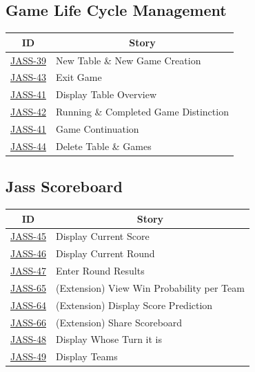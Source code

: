 \subsection {Game Life Cycle Management}

\begin{tabular} { | m{1.75 cm} | m{5.25cm} | }
    \hline
    \multicolumn{1}{|c|}{\textbf{ID}} & \multicolumn{1}{|c|}{ \textbf{Story} }  \\
    \hline
    \href{https://jasstracker-jira.atlassian.net/browse/JASS-39}{JASS-39}  & New Table \& New Game Creation \\
    \hline
    \href{https://jasstracker-jira.atlassian.net/browse/JASS-43}{JASS-43} & Exit Game \\
    \hline
    \href{https://jasstracker-jira.atlassian.net/browse/JASS-41}{JASS-41} & Display Table Overview \\ 
    \hline
    \href{https://jasstracker-jira.atlassian.net/browse/JASS-42}{JASS-42} & Running \& Completed Game Distinction \\
    \hline
    \href{https://jasstracker-jira.atlassian.net/browse/JASS-41}{JASS-41} & Game Continuation \\ 
    \hline
    \href{https://jasstracker-jira.atlassian.net/browse/JASS-44}{JASS-44} & Delete Table \& Games \\
    \hline
\end{tabular}

\subsection{Jass Scoreboard}
\begin{tabular} { | m{1.75 cm} | m{5.25cm} | }
    \hline
    \multicolumn{1}{|c|}{\textbf{ID}} & \multicolumn{1}{|c|}{ \textbf{Story} }  \\
    \hline
    \href{https://jasstracker-jira.atlassian.net/browse/JASS-45}{JASS-45} & Display Current Score \\
    \hline
    \href{https://jasstracker-jira.atlassian.net/browse/JASS-46}{JASS-46} & Display Current Round \\
    \hline
    \href{https://jasstracker-jira.atlassian.net/browse/JASS-47}{JASS-47} & Enter Round Results \\
    \hline
    \href{https://jasstracker-jira.atlassian.net/browse/JASS-65}{JASS-65} & (Extension) View Win Probability per Team \\
    \hline
    \href{https://jasstracker-jira.atlassian.net/browse/JASS-64}{JASS-64} & (Extension) Display Score Prediction \\
    \hline
    \href{https://jasstracker-jira.atlassian.net/browse/JASS-66}{JASS-66} & (Extension) Share Scoreboard \\
    \hline
    \href{https://jasstracker-jira.atlassian.net/browse/JASS-48}{JASS-48} & Display Whose Turn it is \\
    \hline
    \href{https://jasstracker-jira.atlassian.net/browse/JASS-49}{JASS-49} & Display Teams \\
    \hline
\end{tabular}

